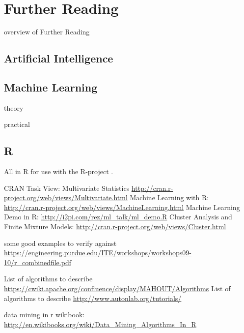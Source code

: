
\section{Further Reading} 
\label{intro:furtherreading}

overview of Further Reading

\subsection{Artificial Intelligence}



\subsection{Machine Learning}

theory

practical

\subsection{R}


All in R for use with the R-project \cite{RDevelopmentCoreTeam2011}.

CRAN Task View: Multivariate Statistics \url{http://cran.r-project.org/web/views/Multivariate.html}
Machine Learning with R: \url{http://cran.r-project.org/web/views/MachineLearning.html}
Machine Learning Demo in R: \url{http://i2pi.com/rez/ml_talk/ml_demo.R}
Cluster Analysis and Finite Mixture Models: \url{http://cran.r-project.org/web/views/Cluster.html}

some good examples to verify against \url{https://engineering.purdue.edu/ITE/workshops/workshops09-10/r_combinedfile.pdf}

List of algorithms to describe \url{https://cwiki.apache.org/confluence/display/MAHOUT/Algorithms}
List of algorithms to describe \url{http://www.autonlab.org/tutorials/}


data mining in r wikibook: \url{http://en.wikibooks.org/wiki/Data_Mining_Algorithms_In_R}